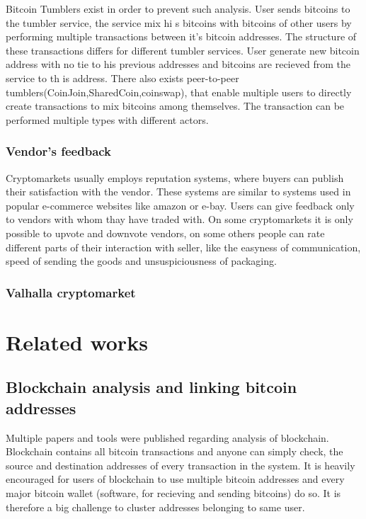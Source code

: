 \documentclass[
  digital, %
  table,   %
  lof,     %
  lot,     %
  oneside
]{fithesis3}
\begin{document}
Bitcoin Tumblers exist in order to prevent such analysis. User sends bitcoins to the tumbler service, the service mix hi
s bitcoins
with bitcoins of other users by performing multiple transactions between it's bitcoin addresses.
The structure of these transactions differs for different tumbler services.
User generate new bitcoin address with no tie to his previous addresses and bitcoins are recieved from the service to th
is address.
 There also exists peer-to-peer tumblers(CoinJoin,SharedCoin,coinswap),
that enable multiple users to directly create transactions to mix bitcoins among themselves.
The transaction can be performed multiple types with different actors.

\subsection{Vendor's feedback}

Cryptomarkets usually employs reputation systems, where buyers can publish their satisfaction with the vendor.
These systems are similar to systems used in popular e-commerce websites like amazon or e-bay.
Users can give feedback only to vendors with whom thay have traded with.
On some cryptomarkets it is only possible to upvote and downvote vendors, on some others people can
rate different parts of their interaction with seller, like the easyness of communication,
speed of sending the goods and unsuspiciousness of packaging.

\subsection{Valhalla cryptomarket}

\chapter{Related works}
\section{Blockchain analysis and linking bitcoin addresses}

Multiple papers and tools were published regarding analysis of blockchain.
Blockchain contains all bitcoin transactions and anyone can simply check,
the source and destination addresses of every transaction in the system.
It is heavily encouraged for users of blockchain to use multiple bitcoin addresses
 and every major bitcoin wallet (software, for recieving and sending bitcoins) do so.
 It is therefore a big challenge to cluster addresses belonging to same user.
 
\end{document}
